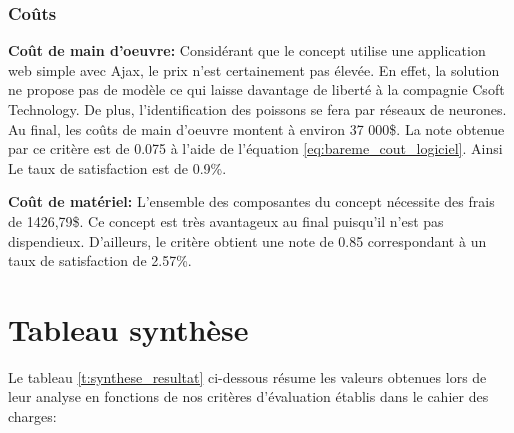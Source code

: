 \subsubsection{Coûts}

\textbf{Coût de main d'oeuvre:} Considérant que le concept utilise une application web simple avec Ajax, le prix n'est certainement pas élevée. En effet, la solution ne propose pas de modèle ce qui laisse davantage de liberté à la compagnie Csoft Technology. De plus, l'identification des poissons se fera par réseaux de neurones. Au final, les coûts de main d'oeuvre montent à environ 37 000\$. La note obtenue par ce critère est de 0.075 à l'aide de l'équation \ref{eq:bareme_cout_logiciel}. Ainsi Le taux de satisfaction est de 0.9\%.
\vspace{5mm}

\textbf{Coût de matériel:} L'ensemble des composantes du concept nécessite des frais de 1426,79\$. Ce concept est très avantageux au final puisqu'il n'est pas dispendieux. D'ailleurs, le critère obtient une note de 0.85 correspondant à un taux de satisfaction de 2.57\%.
\vspace{5mm}

\section{Tableau synthèse}

Le tableau \ref{t:synthese_resultat} ci-dessous résume les valeurs obtenues lors de leur analyse en fonctions de nos critères d'évaluation établis dans le cahier des charges:


